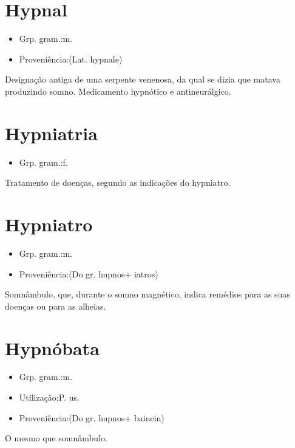 \documentclass{article}
\begin{document}
\section{Hypnal}
\begin{itemize}
\item {Grp. gram.:m.}
\end{itemize}
\begin{itemize}
\item {Proveniência:(Lat. \textunderscore hypnale\textunderscore )}
\end{itemize}
Designação antiga de uma serpente venenosa, da qual se dizia que matava produzindo somno.
Medicamento hypnótico e antineurálgico.
\section{Hypniatria}
\begin{itemize}
\item {Grp. gram.:f.}
\end{itemize}
Tratamento de doenças, segundo as indicações do hypniatro.
\section{Hypniatro}
\begin{itemize}
\item {Grp. gram.:m.}
\end{itemize}
\begin{itemize}
\item {Proveniência:(Do gr. \textunderscore hupnos\textunderscore  + \textunderscore iatros\textunderscore )}
\end{itemize}
Somnâmbulo, que, durante o somno magnético, indica remédios para as suas doenças ou para as alheias.
\section{Hypnóbata}
\begin{itemize}
\item {Grp. gram.:m.}
\end{itemize}
\begin{itemize}
\item {Utilização:P. us.}
\end{itemize}
\begin{itemize}
\item {Proveniência:(Do gr. \textunderscore hupnos\textunderscore  + \textunderscore bainein\textunderscore )}
\end{itemize}
O mesmo que \textunderscore somnâmbulo\textunderscore .
\end{document}
